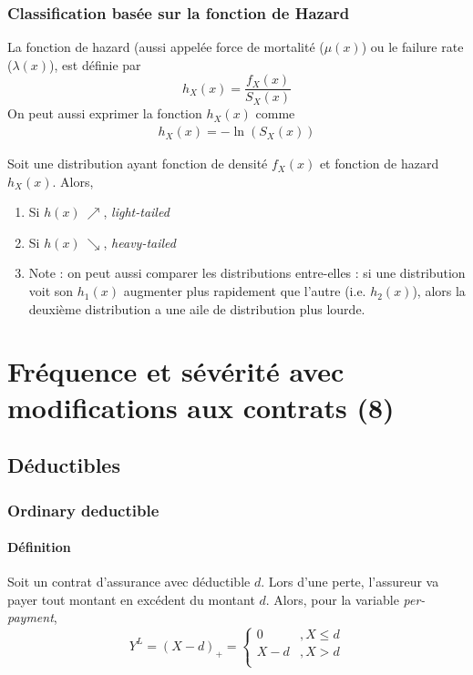 \documentclass[12pt, french]{report}
\begin{document}
\subsection{Classification basée sur la fonction de Hazard}

\begin{definition}
La fonction de hazard (aussi appelée force de mortalité ($\mu(x)$) ou le failure rate ($\lambda(x)$), est définie par
\begin{equation}
h_X(x) = \frac{f_X(x)}{S_X(x)}
\end{equation}
On peut aussi exprimer la fonction $h_X(x)$ comme
\begin{align*}
h_X(x) = - \ln (S_X(x))
\end{align*}
\end{definition}
Soit une distribution ayant fonction de densité $f_X(x)$ et fonction de hazard $h_X(x)$. Alors,
\begin{enumerate}[label=\faAngleRight]
\item Si $h(x) \ \nearrow$, \textit{light-tailed}
\item Si $h(x) \ \searrow$, \textit{heavy-tailed}
\item Note : on peut aussi comparer les distributions entre-elles : si une distribution voit son $h_1(x)$ augmenter plus rapidement que l'autre (i.e. $h_2(x)$), alors la deuxième distribution a une aile de distribution plus lourde.
\end{enumerate}


\chapter{Fréquence et sévérité avec modifications aux contrats (8)}
\setcounter{section}{1}
\section{Déductibles}
\subsection{Ordinary deductible}
\subsubsection{Définition}
Soit un contrat d'assurance avec déductible $d$. Lors d'une perte, l'assureur va payer tout montant en excédent du montant $d$. Alors, pour la variable \textit{per-payment},
\begin{equation}
Y^L = (X-d)_+ = 
\begin{cases}
0		& , X \leq d \\
X - d	& , X > d \\
\end{cases}
\end{equation}
\end{document}
